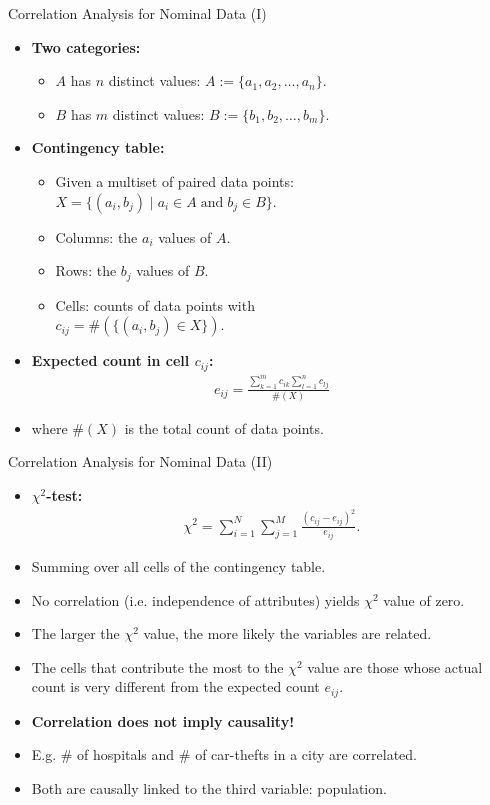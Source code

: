 \begin{frame}{Correlation Analysis for Nominal Data (I)}
	\begin{itemize}
		\item \textbf{Two categories:}
		\begin{itemize}
			\item $A$ has $n$ distinct values: $A := \{a_1, a_2, \ldots, a_n\}$.
			\item $B$ has $m$ distinct values: $B := \{b_1, b_2, \ldots, b_m\}$.
		\end{itemize}
		\item \textbf{\color{airforceblue}Contingency table:}
		\begin{itemize}
			\item Given a multiset of paired data points: $X = \{(a_i,b_j) \; 
			\vert \; a_i \in A \; \text{and} \; b_j \in B\}$.
			\item Columns: the $a_i$ values of $A$.
			\item Rows: the $b_j$ values of $B$.
			\item Cells: counts of data points with \\
			$c_{ij} = \#(\{(a_i,b_j) \in X \})$.
		\end{itemize}
		\item \textbf{Expected count in cell $c_{ij}$:}
		\begin{align}
			e_{ij} = \frac{\sum_{k=1}^{m} c_{ik}\sum_{l=1}^{n} c_{lj}}{\#(X)} 
		\end{align}
		\item where $\#(X)$ is the total count of data points.
	\end{itemize}
\end{frame}

\begin{frame}{Correlation Analysis for Nominal Data (II)}
	\begin{itemize}
		\item \textbf{\color{airforceblue}$\chi^2$-test:}
		\begin{align}
			\chi^2 = \sum_{i=1}^{N}\sum_{j=1}^{M} 
			\frac{(c_{ij}-e_{ij})^2}{e_{ij}}. 
		\end{align}
		\item Summing over all cells of the contingency table.
		\item No correlation (i.e. independence of attributes) yields $\chi^2$ 
		value of zero.
		\item The larger the $\chi^2$ value, the more likely the variables are 
		related.
		\item The cells that contribute the most to the $\chi^2$ value
		are those whose actual count is very different from the expected count 
		$e_{ij}$.
	\end{itemize}
	\begin{itemize}
		\item \textbf{Correlation does not imply causality!}
		\item E.g. $\#$ of hospitals and $\#$ of car-thefts in a city are 
		correlated.
		\item Both are causally linked to the third variable: population.
	\end{itemize}
\end{frame}


